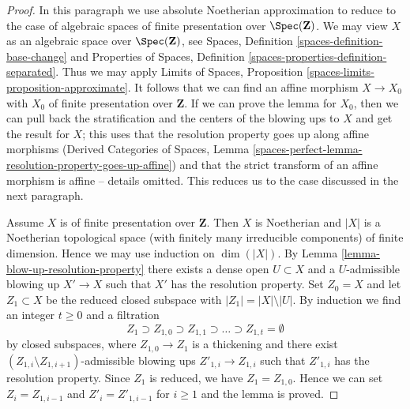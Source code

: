 \begin{proof}
In this paragraph we use absolute Noetherian approximation to reduce to the
case of algebraic spaces of finite presentation over $\Spec(\mathbf{Z})$.
We may view $X$ as an algebraic space over $\Spec(\mathbf{Z})$, see
Spaces, Definition \ref{spaces-definition-base-change} and
Properties of Spaces, Definition \ref{spaces-properties-definition-separated}.
Thus we may apply Limits of Spaces, Proposition
\ref{spaces-limits-proposition-approximate}.
It follows that we can find an affine morphism $X \to X_0$
with $X_0$ of finite presentation over $\mathbf{Z}$.
If we can prove the lemma for $X_0$, then we can pull back
the stratification and the centers of the blowing ups to $X$
and get the result for $X$; this uses that the resolution property
goes up along affine morphisms (Derived Categories of Spaces,
Lemma \ref{spaces-perfect-lemma-resolution-property-goes-up-affine}) and
that the strict transform of an affine morphism is affine -- details omitted.
This reduces us to the case discussed in the next paragraph.

\medskip\noindent
Assume $X$ is of finite presentation over $\mathbf{Z}$.
Then $X$ is Noetherian and $|X|$ is a Noetherian topological
space (with finitely many irreducible components) of finite dimension.
Hence we may use induction on $\dim(|X|)$.
By Lemma \ref{lemma-blow-up-resolution-property}
there exists a dense open $U \subset X$ and a $U$-admissible
blowing up $X' \to X$ such that $X'$ has the resolution property.
Set $Z_0 = X$ and let $Z_1 \subset X$ be the reduced closed subspace
with $|Z_1| = |X| \setminus |U|$.
By induction we find an integer $t \geq 0$ and a filtration
$$
Z_1 \supset Z_{1, 0} \supset Z_{1, 1} \supset \ldots
\supset Z_{1, t} = \emptyset
$$
by closed subspaces, where $Z_{1, 0} \to Z_1$ is a thickening
and there exist $(Z_{1, i} \setminus Z_{1, i + 1})$-admissible
blowing ups $Z'_{1, i} \to Z_{1, i}$ such that $Z'_{1, i}$
has the resolution property. Since $Z_1$ is reduced, we have $Z_1 = Z_{1, 0}$.
Hence we can set $Z_i = Z_{1, i - 1}$ and $Z'_i = Z'_{1, i - 1}$
for $i \geq 1$ and the lemma is proved.
\end{proof}
















